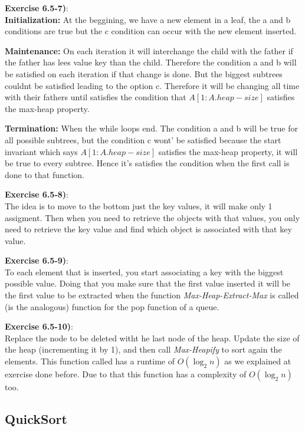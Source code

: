 \documentclass{article}
\newcounter{exercise}[section]   %
\begin{document}
\textbf{Exercise 6.5-7)}:\\
\textbf{Initialization:} At the beggining, we have a new element in a leaf, the a and b
conditions are true but the c condition can occur with the new element inserted.

\textbf{Maintenance:} On each iteration it will interchange the child with the father if the
father has lees value key than the child. Therefore the condition a and b will be satisfied
on each iteration if that change is done. But the biggest subtrees couldnt be satisfied leading
to the option c. Therefore it will be changing all time with their fathers until satisfies
the condition that \(A[1:A.heap-size]\) satisfies the max-heap property.

\textbf{Termination:} When the while loops end. The condition a and b will be true for all
possible subtrees, but the condition c wont' be satisfied because the start invariant which
says \(A[1:A.heap-size]\) satisfies the max-heap property, it will be true to every subtree.
Hence it's satisfies the condition when the first call is done to that function.

\textbf{Exercise 6.5-8)}:\\
The idea is to move to the bottom just the key values, it will make only 1 assigment. Then
when you need to retrieve the objects with that values, you only need to retrieve the key
value and find which object is associated with that key value.

\textbf{Exercise 6.5-9)}:\\
To each element that is inserted, you start associating a key with the biggest possible
value. Doing that you make sure that the first value inserted it will be the first value
to be extracted when the function \textit{Max-Heap-Extract-Max} is called (is the analogous)
function for the pop function of a queue.

\textbf{Exercise 6.5-10)}:\\
Replace the node to be deleted witht he last node of the heap. Update the size of the heap
(incrementing it by 1), and then call \textit{Max-Heapify} to sort again the elements.
This function called has a runtime of \(O(\log_2 n)\) as we explained at exercise done before.
Due to that this function has a complexity of \(O(\log_2 n)\) too.

\subsection{QuickSort}
\setcounter{exercise}{0}
\end{document}
